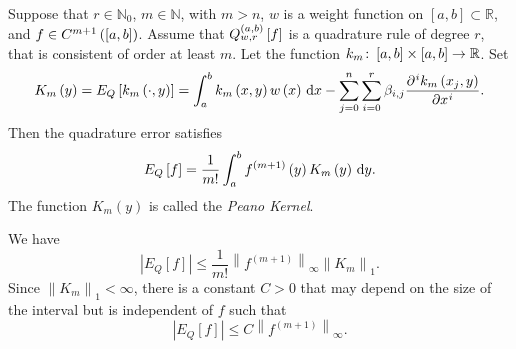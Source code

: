 \begin{frame}
	\begin{theorem}
		Suppose that $r\in\mathbb{N}_{0}$, $m\in\mathbb{N}$, with $m>n$,
		$w$ is a weight function on $\left[a,b\right]\subset\mathbb{R}$, and
		$f\in C^{m+1}\left(\left[a,b\right]\right)$.
		Assume that
		\begin{math}
			Q^{\left(a,b\right)}_{w,r}
			\left[f\right]
		\end{math}
		is a quadrature rule of degree $r$,
		that is consistent of order at least $m$.
		Let the function
		\begin{math}
			k_{m}\colon\left[a,b\right]\times\left[a,b\right]\to\mathbb{R}
		\end{math}.
		Set
		\begin{equation*}
			K_{m}\left(y\right)=
			E_{Q}\left[k_{m}\left(\cdot, y\right)\right]=
			\int_{a}^{b}
			k_{m}\left(x,y\right)w\left(x\right)\dl x-
			\sum_{j=0}^{n}
			\sum_{i=0}^{r}
			\beta_{i,j}
			\diffp[i]{k_{m}\left(x_{j},y\right)}{x}.
		\end{equation*}
		Then the quadrature error satisfies
		\begin{equation*}
			E_{Q}\left[f\right]=
			\dfrac{1}{m!}
			\int_{a}^{b}
			f^{\left(m+1\right)}\left(y\right)
			K_{m}\left(y\right)
			\dl y.
		\end{equation*}
		The function $K_{m}\left(y\right)$ is called the \emph{Peano Kernel}.
	\end{theorem}

	\begin{theorem}
		We have
		\begin{equation*}
			\left|
			E_{Q}
			\left[f\right]
			\right|\leq
			\dfrac{1}{m!}
			{\left\|
				f^{\left(m+1\right)}
				\right\|}_{\infty}
			{\left\|
				K_{m}
				\right\|}_{1}.
		\end{equation*}
		Since ${\left\|K_{m}\right\|}_{1}<\infty$, there is a
		constant $C>0$ that may depend on the size of the interval
		but is independent of $f$ such that
		\begin{equation*}
			\left|
			E_{Q}
			\left[f\right]
			\right|\leq
			C{\left\|
					f^{\left(m+1\right)}
					\right\|}_{\infty}.
		\end{equation*}
	\end{theorem}
\end{frame}

